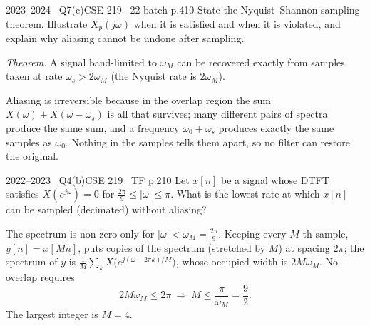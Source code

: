 \begin{qcard}{2023--2024 \textbullet\ Q7(c)}{CSE 219 \textbullet\ 22 batch p.4}{10}
State the Nyquist--Shannon sampling theorem. Illustrate $X_p(j\omega)$ when it is satisfied and when it is violated, and explain why aliasing cannot be undone after sampling.
\end{qcard}
\begin{solution}
\emph{Theorem.} A signal band-limited to $\omega_M$ can be recovered exactly from samples taken at rate $\omega_s>2\omega_M$ (the Nyquist rate is $2\omega_M$).

\begin{center}
\end{center}
Aliasing is irreversible because in the overlap region the sum $X(\omega)+X(\omega-\omega_s)$ is all that survives; many different pairs of spectra produce the same sum, and a frequency $\omega_0+\omega_s$ produces exactly the same samples as $\omega_0$. Nothing in the samples tells them apart, so no filter can restore the original.
\end{solution}

\begin{qcard}{2022--2023 \textbullet\ Q4(b)}{CSE 219 \textbullet\ TF p.2}{10}
Let $x[n]$ be a signal whose DTFT satisfies $X(e^{j\omega})=0$ for $\frac{2\pi}9\le|\omega|\le\pi$. What is the lowest rate at which $x[n]$ can be sampled (decimated) without aliasing?
\end{qcard}
\begin{solution}
The spectrum is non-zero only for $|\omega|<\omega_M=\frac{2\pi}9$. Keeping every $M$-th sample, $y[n]=x[Mn]$, puts copies of the spectrum (stretched by $M$) at spacing $2\pi$; the spectrum of $y$ is $\frac1M\sum_kX\big(e^{j(\omega-2\pi k)/M}\big)$, whose occupied width is $2M\omega_M$. No overlap requires
\[2M\omega_M\le2\pi\ \Rightarrow\ M\le\frac{\pi}{\omega_M}=\frac92 .\]
The largest integer is $M=4$.
\end{solution}

